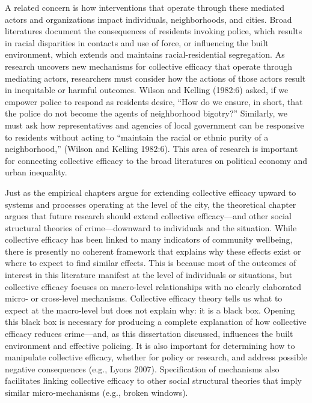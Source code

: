 \documentclass [11pt, proquest] {uwthesis}[2015/03/03]
\begin{document}
A related concern is how interventions that operate through these mediated actors and organizations impact individuals, neighborhoods, and cities. Broad literatures document the consequences of residents invoking police, which results in racial disparities in contacts and use of force, or influencing the built environment, which extends and maintains racial-residential segregation. As research uncovers new mechanisms for collective efficacy that operate through mediating actors, researchers must consider how the actions of those actors result in inequitable or harmful outcomes. Wilson and Kelling (1982:6) asked, if we empower police to respond as residents desire, ``How do we ensure, in short, that the police do not become the agents of neighborhood bigotry?'' Similarly, we must ask how representatives and agencies of local government can be responsive to residents without acting to ``maintain the racial or ethnic purity of a neighborhood,'' (Wilson and Kelling 1982:6). This area of research is important for connecting collective efficacy to the broad literatures on political economy and urban inequality.

Just as the empirical chapters argue for extending collective efficacy upward to systems and processes operating at the level of the city, the theoretical chapter argues that future research should extend collective efficacy---and other social structural theories of crime---downward to individuals and the situation. While collective efficacy has been linked to many indicators of community wellbeing, there is presently no coherent framework that explains why these effects exist or where to expect to find similar effects. This is because most of the outcomes of interest in this literature manifest at the level of individuals or situations, but collective efficacy focuses on macro-level relationships with no clearly elaborated micro- or cross-level mechanisms. Collective efficacy theory tells us what to expect at the macro-level but does not explain why: it is a black box. Opening this black box is necessary for producing a complete explanation of how collective efficacy reduces crime---and, as this dissertation discussed, influences the built environment and effective policing. It is also important for determining how to manipulate collective efficacy, whether for policy or research, and address possible negative consequences (e.g., Lyons 2007). Specification of mechanisms also facilitates linking collective efficacy to other social structural theories that imply similar micro-mechanisms (e.g., broken windows).
\end{document}

